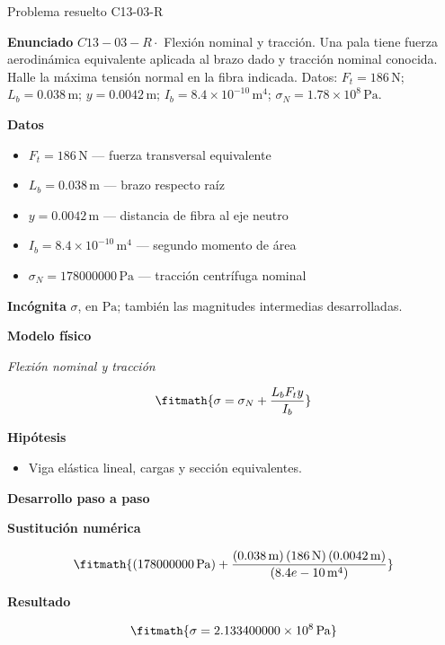 \documentclass[10pt,openany]{book}
\begin{document}
\begin{studiumworked}{Problema resuelto C13-03-R}


\noindent\textbf{Enunciado}
\(C13-03-R \cdot\) Flexión nominal y tracción. Una pala tiene fuerza aerodinámica equivalente aplicada al brazo dado y tracción nominal conocida. Halle la máxima tensión normal en la fibra indicada. Datos: \(F_t=186\, \mathrm{N}\); \(L_b=0.038\, \mathrm{m}\); \(y=0.0042\, \mathrm{m}\); \(I_b=8.4\times 10^{-10}\, \mathrm{m}^{4}\); \(\sigma_N=1.78\times 10^{8}\, \mathrm{Pa}\).

\noindent\textbf{Datos}
\begin{itemize}
\item $F_t = 186\,\mathrm{N}$ — fuerza transversal equivalente
\item $L_b = 0.038\,\mathrm{m}$ — brazo respecto raíz
\item $y = 0.0042\,\mathrm{m}$ — distancia de fibra al eje neutro
\item $I_b = 8.4\times 10^{-10}\,\mathrm{m}^{4}$ — segundo momento de área
\item $\sigma_N = 178000000\,\mathrm{Pa}$ — tracción centrífuga nominal
\end{itemize}

\noindent\textbf{Incógnita}
$\sigma$, en $\mathrm{Pa}$; también las magnitudes intermedias desarrolladas.

\noindent\textbf{Modelo físico}

\noindent\textit{Flexión nominal y tracción}

\[
\fitmath{\sigma=\sigma_N + \frac{L_b F_t y}{I_b}}
\]

\noindent\textbf{Hipótesis}
\begin{itemize}
\item Viga elástica lineal, cargas y sección equivalentes.
\end{itemize}

\noindent\textbf{Desarrollo paso a paso}



\noindent\textbf{Sustitución numérica}

\[
\fitmath{\left(178000000\,\mathrm{Pa}\right) + \frac{\left(0.038\,\mathrm{m}\right) \left(186\,\mathrm{N}\right) \left(0.0042\,\mathrm{m}\right)}{\left(8.4e-10\,\mathrm{m}^{4}\right)}}
\]

\noindent\textbf{Resultado}

\[
\fitmath{\sigma=2.133400000\times10^{8}\,\mathrm{Pa}}
\]


\end{studiumworked}
\end{document}
